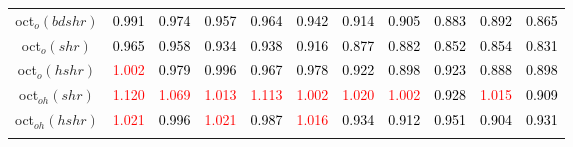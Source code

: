 \begin{tabular}[t]{c|>{}cccc>{}c|ccccc}
oct$_o(bdshr)$ & \textcolor{black}{0.991} & \textcolor{black}{0.974} & \textcolor{black}{0.957} & \textcolor{black}{0.964} & \textcolor{black}{0.942} & \textcolor{black}{0.914} & \textcolor{black}{0.905} & \textcolor{black}{0.883} & \textcolor{black}{0.892} & \textcolor{black}{0.865}\\
oct$_o(shr)$ & \textcolor{black}{0.965} & \textcolor{black}{0.958} & \textcolor{black}{0.934} & \textcolor{black}{0.938} & \textcolor{black}{0.916} & \textcolor{black}{0.877} & \textcolor{black}{0.882} & \textcolor{black}{0.852} & \textcolor{black}{0.854} & \textcolor{black}{0.831}\\
oct$_o(hshr)$ & \textcolor{red}{1.002} & \textcolor{black}{0.979} & \textcolor{black}{0.996} & \textcolor{black}{0.967} & \textcolor{black}{0.978} & \textcolor{black}{0.922} & \textcolor{black}{0.898} & \textcolor{black}{0.923} & \textcolor{black}{0.888} & \textcolor{black}{0.898}\\
oct$_{oh}(shr)$ & \textcolor{red}{1.120} & \textcolor{red}{1.069} & \textcolor{red}{1.013} & \textcolor{red}{1.113} & \textcolor{red}{1.002} & \textcolor{red}{1.020} & \textcolor{red}{1.002} & \textcolor{black}{0.928} & \textcolor{red}{1.015} & \textcolor{black}{0.909}\\
oct$_{oh}(hshr)$ & \textcolor{red}{1.021} & \textcolor{black}{0.996} & \textcolor{red}{1.021} & \textcolor{black}{0.987} & \textcolor{red}{1.016} & \textcolor{black}{0.934} & \textcolor{black}{0.912} & \textcolor{black}{0.951} & \textcolor{black}{0.904} & \textcolor{black}{0.931}\\
\bottomrule
{}\\
\end{tabular}
